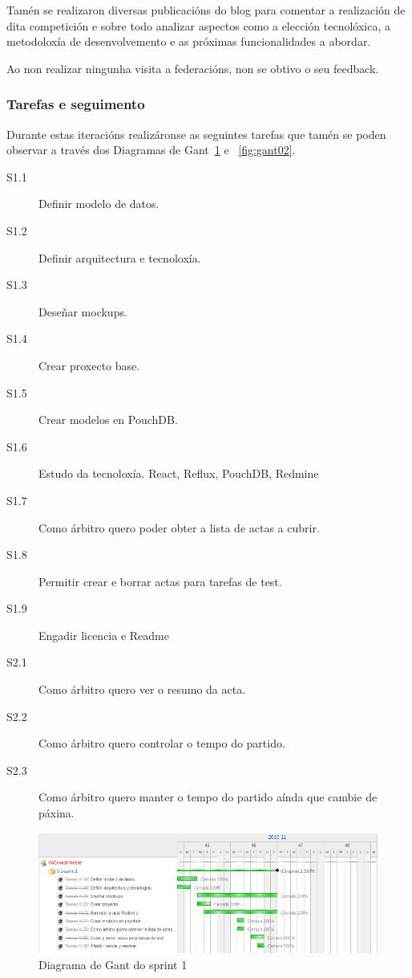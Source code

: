       Tamén se realizaron diversas publicacións do blog para comentar a 
realización de dita competición e sobre todo analizar aspectos como a elección 
tecnolóxica, a metodoloxía de desenvolvemento e as próximas funcionalidades a 
abordar.

  Ao non realizar ningunha visita a federacións, non se obtivo o seu feedback.

      \subsubsection{Tarefas e seguimento}

      Durante estas iteracións realizáronse as seguintes tarefas que tamén 
se poden observar a través dos Diagramas de Gant~\ref{fig:gant01} e 
~\ref{fig:gant02}.

        \begin{description}
         \item [S1.1] Definir modelo de datos.
         \item [S1.2] Definir arquitectura e tecnoloxía.
         \item [S1.3] Deseñar mockups.
         \item [S1.4] Crear proxecto base.
         \item [S1.5] Crear modelos en PouchDB.
         \item [S1.6] Estudo da tecnoloxía. React, Reflux, PouchDB, Redmine
         \item [S1.7] Como árbitro quero poder obter a lista de actas a cubrir.
         \item [S1.8] Permitir crear e borrar actas para tarefas de test.
         \item [S1.9] Engadir licencia e Readme
         \item [S2.1] Como árbitro quero ver o resumo da acta.
         \item [S2.2] Como árbitro quero controlar o tempo do partido.
         \item [S2.3] Como árbitro quero manter o tempo do partido aínda que 
cambie de páxina.
         \end{description}

        \begin{figure}[h!]
          \begin{center}
          \includegraphics[width=\textwidth]{./img/gant_diagrams/01.png}
          \caption{Diagrama de Gant do sprint 1}
          \label{fig:gant01}
          \end{center}
        \end{figure}


